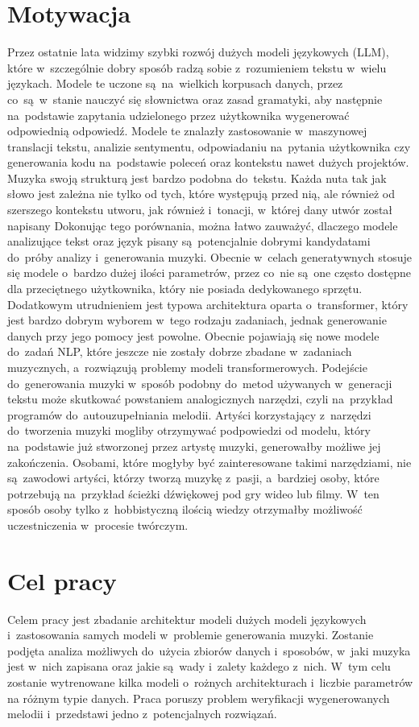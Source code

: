 \documentclass[data-science]{agh-wi} %
\begin{document}
\section{Motywacja}
Przez ostatnie lata widzimy szybki rozwój dużych modeli językowych (LLM), które w~szczególnie dobry sposób radzą sobie z~rozumieniem tekstu w~wielu językach. Modele te uczone są~na~wielkich korpusach danych, przez co~są~w~stanie nauczyć się słownictwa oraz zasad gramatyki, aby następnie na~podstawie zapytania udzielonego przez użytkownika wygenerować odpowiednią odpowiedź. Modele te znalazły zastosowanie w~maszynowej translacji tekstu, analizie sentymentu, odpowiadaniu na~pytania użytkownika czy generowania kodu na~podstawie poleceń oraz kontekstu nawet dużych projektów. Muzyka swoją strukturą jest bardzo podobna do~tekstu. Każda nuta tak jak słowo jest zależna nie tylko od tych, które występują przed nią, ale również od szerszego kontekstu utworu, jak również i~tonacji, w~której dany utwór został napisany Dokonując tego porównania, można łatwo zauważyć, dlaczego modele analizujące tekst oraz język pisany są~potencjalnie dobrymi kandydatami do~próby analizy i~generowania muzyki. Obecnie w~celach generatywnych stosuje się modele o~bardzo dużej ilości parametrów, przez co~nie są~one często dostępne dla przeciętnego użytkownika, który nie posiada dedykowanego sprzętu. Dodatkowym utrudnieniem jest typowa architektura oparta o~transformer, który jest bardzo dobrym wyborem w~tego rodzaju zadaniach, jednak generowanie danych przy jego pomocy jest powolne. Obecnie pojawiają się nowe modele do~zadań NLP, które jeszcze nie zostały dobrze zbadane w~zadaniach muzycznych, a~rozwiązują problemy modeli transformerowych. Podejście do~generowania muzyki w~sposób podobny do~metod używanych w~generacji tekstu może skutkować powstaniem analogicznych narzędzi, czyli na~przykład programów do~autouzupełniania  melodii. Artyści korzystający z~narzędzi do~tworzenia muzyki mogliby otrzymywać podpowiedzi od modelu, który na~podstawie już stworzonej przez artystę muzyki, generowałby możliwe jej zakończenia. Osobami, które mogłyby być zainteresowane takimi narzędziami, nie są~zawodowi artyści, którzy tworzą muzykę z~pasji, a~bardziej osoby, które potrzebują na~przykład ścieżki dźwiękowej pod gry wideo lub filmy. W~ten sposób osoby tylko z~hobbistyczną ilością wiedzy otrzymałby możliwość uczestniczenia w~procesie twórczym.
\section{Cel pracy}
Celem pracy jest zbadanie architektur modeli dużych modeli językowych i~zastosowania samych modeli w~problemie generowania muzyki. Zostanie podjęta analiza możliwych do~użycia zbiorów danych i~sposobów, w~jaki muzyka jest w~nich zapisana oraz jakie są~wady i~zalety każdego z~nich. W~tym celu zostanie wytrenowane kilka modeli o~rożnych architekturach i~liczbie parametrów na różnym typie danych. Praca poruszy problem weryfikacji wygenerowanych melodii i~przedstawi jedno z~potencjalnych rozwiązań.
\end{document}
